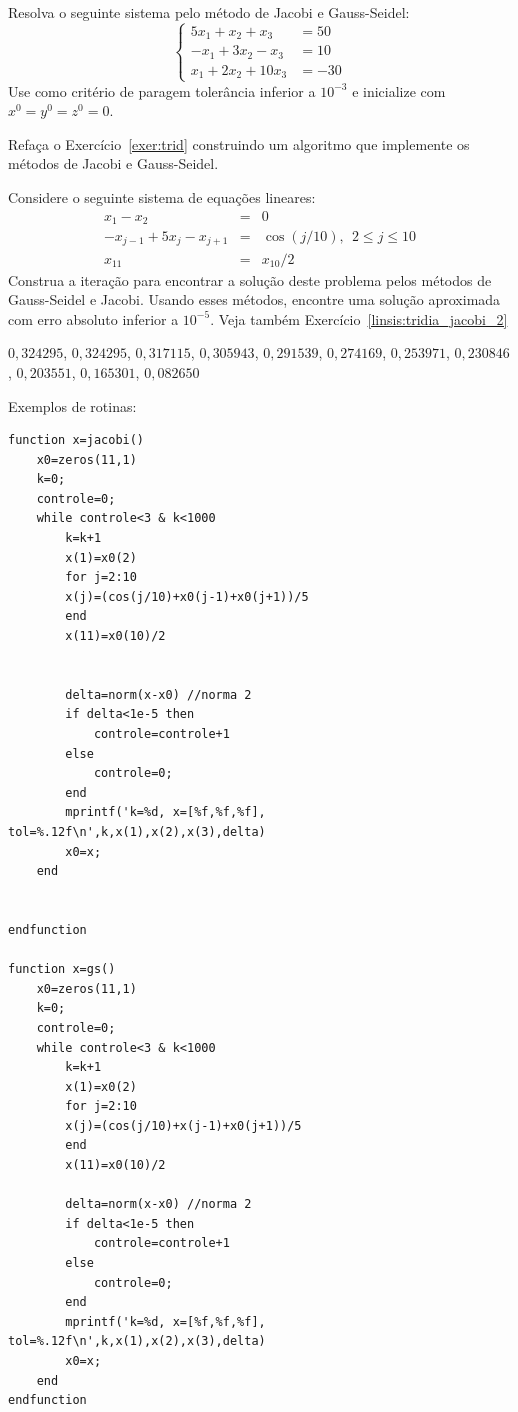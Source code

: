 \begin{exer}
Resolva o seguinte sistema pelo método de Jacobi e Gauss-Seidel:
\begin{equation}\left\{\begin{array}{ll}
5x_1+x_2+x_3&=50\\
-x_1+3x_2-x_3&=10\\
x_1+2x_2+10x_3&=-30
\end{array}\right.\end{equation}
Use como critério de paragem tolerância inferior a $10^{-3}$ e inicialize com $x^{0}=y^{0}=z^{0}=0$.
\end{exer}

\begin{exer}Refaça o Exercício~\ref{exer:trid} construindo um algoritmo que implemente os métodos de Jacobi e Gauss-Seidel.
\end{exer}

\begin{exer}\label{linsis:tridia_jacobi_1} Considere o seguinte sistema de equações lineares:
\begin{eqnarray}
x_1-x_2&=&0\nonumber\\
-x_{j-1}+5x_j-x_{j+1}&=&\cos(j/10),~~ 2\leq j \leq 10\nonumber\\
x_{11}&=&x_{10}/2
\end{eqnarray}
Construa a iteração para encontrar a solução deste problema pelos métodos de Gauss-Seidel e Jacobi. Usando esses métodos, encontre uma solução aproximada com erro absoluto inferior a $10^{-5}$. Veja também Exercício~\ref{linsis:tridia_jacobi_2}
\end{exer}
\begin{resp}

$0,324295$, $0,324295$, $0,317115$, $0,305943$, $0,291539$, $0,274169$, $0,253971$, $0,230846$, $0,203551$, $0,165301$, $0,082650$

\ifisscilab
Exemplos de rotinas:
\begin{verbatim}
function x=jacobi()
    x0=zeros(11,1)
    k=0;
    controle=0;
    while controle<3 & k<1000
        k=k+1
        x(1)=x0(2)
        for j=2:10
        x(j)=(cos(j/10)+x0(j-1)+x0(j+1))/5
        end
        x(11)=x0(10)/2


        delta=norm(x-x0) //norma 2
        if delta<1e-5 then
            controle=controle+1
        else
            controle=0;
        end
        mprintf('k=%d, x=[%f,%f,%f], tol=%.12f\n',k,x(1),x(2),x(3),delta)
        x0=x;
    end


endfunction

function x=gs()
    x0=zeros(11,1)
    k=0;
    controle=0;
    while controle<3 & k<1000
        k=k+1
        x(1)=x0(2)
        for j=2:10
        x(j)=(cos(j/10)+x(j-1)+x0(j+1))/5
        end
        x(11)=x0(10)/2

        delta=norm(x-x0) //norma 2
        if delta<1e-5 then
            controle=controle+1
        else
            controle=0;
        end
        mprintf('k=%d, x=[%f,%f,%f], tol=%.12f\n',k,x(1),x(2),x(3),delta)
        x0=x;
    end
endfunction
\end{verbatim}
\fi

\end{resp}

